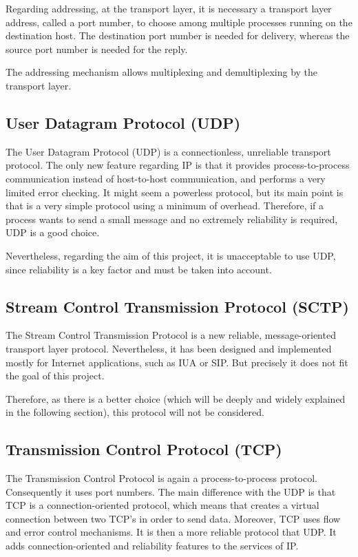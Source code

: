 Regarding addressing, at the transport layer, it is necessary a transport layer address, called a port number, to choose among multiple processes running on the destination host. The destination port number is needed for delivery, whereas the source port number is needed for the reply. 

The addressing mechanism allows multiplexing and demultiplexing by the transport layer.
	

\subsection{User Datagram Protocol (UDP)}
The User Datagram Protocol (UDP) is a connectionless, unreliable transport protocol. The only new feature regarding IP is that it provides process-to-process communication instead of host-to-host communication, and performs a very limited error checking. It might seem a powerless protocol, but its main point is that is a very simple protocol using a minimum of overhead. Therefore, if a process wants to send a small message and no extremely reliability is required, UDP is a good choice. 

Nevertheless, regarding the aim of this project, it is unacceptable to use UDP, since reliability is a key factor and must be taken into account.

\subsection{Stream Control Transmission Protocol (SCTP)}
The Stream Control Transmission Protocol is a new reliable, message-oriented transport layer protocol. Nevertheless, it has been designed and implemented mostly for Internet applications, such as IUA or SIP. But precisely it does not fit the goal of this project. 

Therefore, as there is a better choice (which will be deeply and widely explained in the following section), this protocol will not be considered. 


\subsection{ Transmission Control Protocol (TCP)}
The Transmission Control Protocol is again a process-to-process protocol. Consequently it uses port numbers. The main difference with the UDP is that TCP is a connection-oriented protocol, which means that creates a virtual connection between two TCP's in order to send data. Moreover, TCP uses flow and error control mechanisms. It is then a more reliable protocol that UDP. It adds connection-oriented and reliability features to the services of IP.

